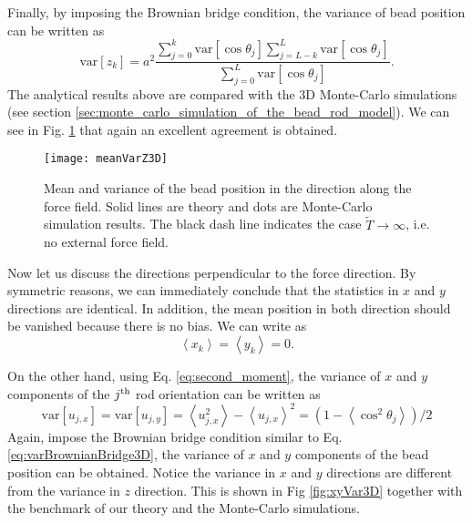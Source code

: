 Finally, by imposing the Brownian bridge condition, the variance of bead position can be written as 
\begin{equation}
    \label{eq:varBrownianBridge3D}
    \text{var}\left[z_k\right] = a^2\frac{\sum_{j=0}^{k}\text{var}\left[\cos\theta_j\right]\sum_{j=L-k}^{L}\text{var}\left[\cos\theta_j\right]}{\sum_{j=0}^{L}\text{var}\left[\cos\theta_j\right]}.
\end{equation}
The analytical results above are compared with the 3D Monte-Carlo simulations (see section \ref{sec:monte_carlo_simulation_of_the_bead_rod_model}). We can see in Fig. \ref{fig:meanVarZ3D} that again an excellent agreement is obtained. 

\begin{figure}[htpb]
    \centering
    \texttt{[image: meanVarZ3D]}
    \caption{Mean and variance of the bead position in the direction along the force field. Solid lines are theory and dots are Monte-Carlo simulation results. The black dash line indicates the case $\tilde{T}\rightarrow\infty$, i.e. no external force field.}
    \label{fig:meanVarZ3D}
\end{figure}

Now let us discuss the directions perpendicular to the force direction. By symmetric reasons, we can immediately conclude that the statistics in $x$ and $y$ directions are identical. In addition, the mean position in both direction should be vanished because there is no bias. We can write as
\begin{equation}
    \label{eq:xyMean}
    \left<x_k\right> = \left<y_k\right> = 0.
\end{equation}

On the other hand, using Eq. \eqref{eq:second_moment}, the variance of $x$ and $y$ components of the $j^{\rm{th}}$ rod orientation can be written as
\begin{equation}
    \label{eq:xyRodVar}
    \text{var}\left[u_{j,x}\right] = \text{var}\left[u_{j,y}\right] = \left<u_{j,x}^2\right> - \left<u_{j,x}\right>^2 = (1-\left<\cos^2\theta_j\right>)/2
\end{equation}
Again, impose the Brownian bridge condition similar to Eq. \eqref{eq:varBrownianBridge3D}, the variance of $x$ and $y$ components of the bead position can be obtained. Notice the variance in $x$ and $y$ directions are different from the variance in $z$ direction. This is shown in Fig \ref{fig:xyVar3D} together with the benchmark of our theory and the Monte-Carlo simulations.

